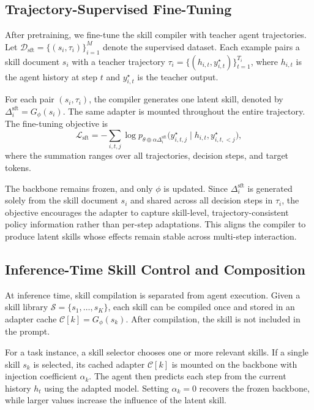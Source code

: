 \subsection{Trajectory-Supervised Fine-Tuning}
\label{sec:sft}

After pretraining, we fine-tune the skill compiler with teacher agent trajectories. Let $\mathcal{D}_{\mathrm{sft}}=\{(s_i,\tau_i)\}_{i=1}^{M}$ denote the supervised dataset. Each example pairs a skill document $s_i$ with a teacher trajectory $\tau_i=\{(h_{i,t}, y_{i,t}^{\star})\}_{t=1}^{T_i}$, where $h_{i,t}$ is the agent history at step $t$ and $y_{i,t}^{\star}$ is the teacher output.

For each pair $(s_i,\tau_i)$, the compiler generates one latent skill, denoted by $\Delta_i^{\mathrm{sft}}=G_\phi(s_i)$. The same adapter is mounted throughout the entire trajectory. The fine-tuning objective is
\begin{equation}
    \mathcal{L}_{\mathrm{sft}}
    =
    -\sum_{i,t,j}
    \log p_{\theta \oplus \alpha \Delta_i^{\mathrm{sft}}}
    \bigl(y_{i,t,j}^{\star}
    \mid h_{i,t}, y_{i,t,<j}^{\star}\bigr),
\end{equation}
where the summation ranges over all trajectories, decision steps, and target tokens.

The backbone remains frozen, and only $\phi$ is updated. Since $\Delta_i^{\mathrm{sft}}$ is generated solely from the skill document $s_i$ and shared across all decision steps in $\tau_i$, the objective encourages the adapter to capture skill-level, trajectory-consistent policy information rather than per-step adaptations. This aligns the compiler to produce latent skills whose effects remain stable across multi-step interaction.

\subsection{Inference-Time Skill Control and Composition}
\label{sec:inference}

At inference time, skill compilation is separated from agent execution. Given a skill library $\mathcal{S}=\{s_1,\ldots,s_K\}$, each skill can be compiled once and stored in an adapter cache $\mathcal{C}[k]=G_\phi(s_k)$. After compilation, the skill is not included in the prompt.

For a task instance, a skill selector chooses one or more relevant skills. If a single skill $s_k$ is selected, its cached adapter $\mathcal{C}[k]$ is mounted on the backbone with injection coefficient $\alpha_k$. The agent then predicts each step from the current history $h_t$ using the adapted model. Setting $\alpha_k=0$ recovers the frozen backbone, while larger values increase the influence of the latent skill.

